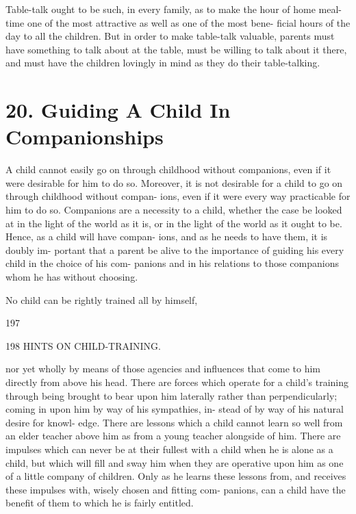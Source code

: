 \documentclass[
]{book}
\begin{document}
Table-talk ought to be such, in every family, as to make the hour of home meal-time one of the most attractive as well as one of the most bene- ficial hours of the day to all the children. But in order to make table-talk valuable, parents must have something to talk about at the table, must be willing to talk about it there, and must have the children lovingly in mind as they do their table-talking.

\hypertarget{guiding-a-child-in-companionships}{%
\chapter{20. Guiding A Child In Companionships}\label{guiding-a-child-in-companionships}}

A child cannot easily go on through childhood without companions, even if it were desirable for him to do so. Moreover, it is not desirable for a child to go on through childhood without compan- ions, even if it were every way practicable for him to do so. Companions are a necessity to a child, whether the case be looked at in the light of the world as it is, or in the light of the world as it ought to be. Hence, as a child will have compan- ions, and as he needs to have them, it is doubly im- portant that a parent be alive to the importance of guiding his every child in the choice of his com- panions and in his relations to those companions whom he has without choosing.

No child can be rightly trained all by himself,

197

198 HINTS ON CHILD-TRAINING.

nor yet wholly by means of those agencies and influences that come to him directly from above his head. There are forces which operate for a child's training through being brought to bear upon him laterally rather than perpendicularly; coming in upon him by way of his sympathies, in- stead of by way of his natural desire for knowl- edge. There are lessons which a child cannot learn so well from an elder teacher above him as from a young teacher alongside of him. There are impulses which can never be at their fullest with a child when he is alone as a child, but which will fill and sway him when they are operative upon him as one of a little company of children. Only as he learns these lessons from, and receives these impulses with, wisely chosen and fitting com- panions, can a child have the benefit of them to which he is fairly entitled.
\end{document}
